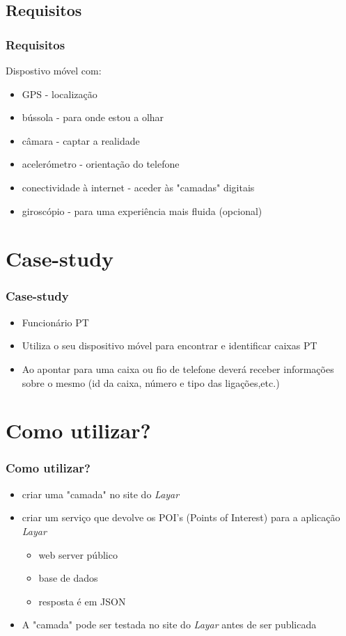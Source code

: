 \documentclass{beamer}
\begin{document}
\subsection{Requisitos}
\begin{frame} \frametitle{Requisitos}
Dispostivo móvel com:
\begin{itemize}
\pause \item GPS - localização
\pause \item bússola - para onde estou a olhar
\pause \item câmara - captar a realidade
\pause \item acelerómetro - orientação do telefone
\pause \item conectividade à internet - aceder às "camadas" digitais
\pause \item giroscópio - para uma experiência mais fluida  (opcional)
\end{itemize}
\end{frame}


\section{Case-study}
\begin{frame} \frametitle{Case-study}
\begin{itemize}
\item Funcionário PT
\pause \item Utiliza o seu dispositivo móvel para encontrar e identificar caixas PT
\pause \item Ao apontar para uma caixa ou fio de telefone deverá receber informações sobre o mesmo (id da caixa, número e tipo das ligações,etc.)
\end{itemize}
\end{frame}


\section{Como utilizar?}
\begin{frame} \frametitle{Como utilizar?}
\begin{itemize}
\item criar uma "camada" no site do \textit{Layar}
\pause \item criar um serviço que devolve os POI's (Points of Interest) para a aplicação \textit{Layar}
		\begin{itemize}
			\pause \item web server público
			\pause \item base de dados
			\pause \item resposta é em JSON
		\end{itemize}
\pause \item A "camada" pode ser testada no site do \textit{Layar} antes de ser publicada
\end{itemize}
\end{frame}
\end{document}
